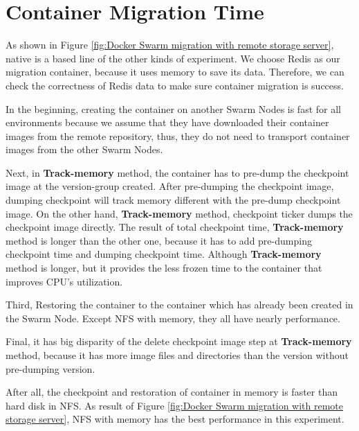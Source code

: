 \section{Container Migration Time}
As shown in Figure \ref{fig:Docker Swarm migration with remote storage server}, native is a based line of the other kinds of experiment. We choose Redis\cite{paksula2010persisting} as our migration container, because it uses memory to save its data. Therefore, we can check the correctness of Redis data to make sure container migration is success.

In the beginning, creating the container on another Swarm Nodes is fast for all environments because we assume that they have downloaded their container images from the remote repository, thus, they do not need to transport container images from the other Swarm Nodes.

Next, in \textbf{Track-memory} method, the container has to pre-dump the checkpoint image at the version-group created. After pre-dumping the checkpoint image, dumping checkpoint will track memory different with the pre-dump checkpoint image.
On the other hand, \textbf{Track-memory} method, checkpoint ticker dumps the checkpoint image directly.
The result of total checkpoint time, \textbf{Track-memory} method is longer than the other one, because it has to add pre-dumping checkpoint time and dumping checkpoint time.
Although \textbf{Track-memory} method is longer, but it provides the less frozen time to the container that improves CPU's utilization.

Third, Restoring the container to the container which has already been created in the Swarm Node. Except NFS with memory, they all have nearly performance.

Final, it has big disparity of the delete checkpoint image step at \textbf{Track-memory} method, because it has more image files and directories than the version without pre-dumping version.

After all, the checkpoint and restoration of container in memory is faster than hard disk in NFS. As result of Figure \ref{fig:Docker Swarm migration with remote storage server}, NFS with memory has the best performance in this experiment.


